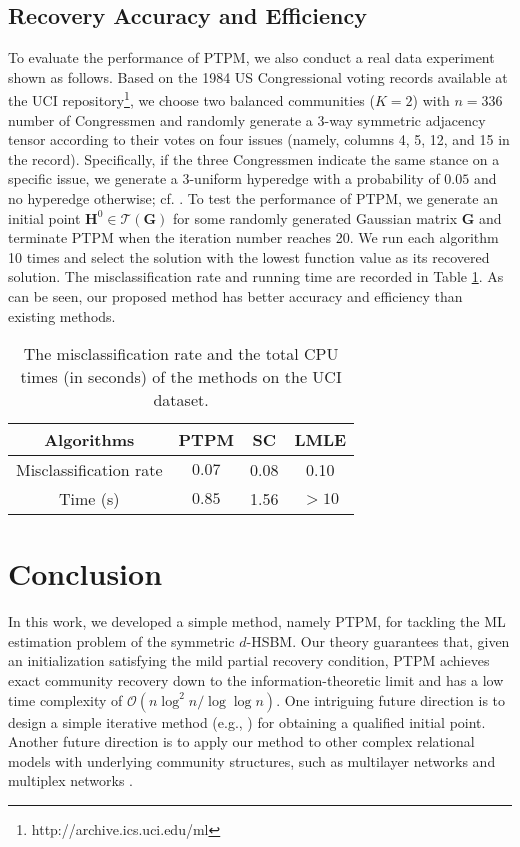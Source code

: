 \documentclass{article}
\theoremstyle{plain}
\theoremstyle{definition}
\theoremstyle{remark}
\newcommand{\OCal}{\mathcal{O}}
\begin{document}
\subsection{Recovery Accuracy and Efficiency}

To evaluate the performance of PTPM, we also conduct a real data experiment shown as follows. Based on the 1984 US Congressional voting records available at the UCI repository\footnote{http://archive.ics.uci.edu/ml}, we choose two balanced communities ($K=2$) with $n=336$ number of Congressmen and randomly generate a 3-way symmetric adjacency tensor according to their votes on four issues (namely, columns 4, 5, 12, and 15 in the record). Specifically, if the three Congressmen indicate the same stance on a specific issue, we generate a 3-uniform hyperedge with a probability of $0.05$ and no hyperedge otherwise; cf. \citet{ghoshdastidar2017consistency,chien2019minimax}. To test the performance of PTPM, we generate an initial point $\bm{H}^0\in\mathcal{T}(\bm{G})$ for some randomly generated Gaussian matrix $\bm{G}$ and terminate PTPM when the iteration number reaches 20. We run each algorithm 10 times and select the solution with the lowest function value as its recovered solution. The misclassification rate and running time are recorded in Table \ref{tab: realdata}. As can be seen, our proposed method has better accuracy and efficiency than existing methods.

\begin{table}[htbp]
	\centering
		\caption{The misclassification rate and the total CPU times (in seconds) of the methods on the UCI dataset.}
  \vskip 0.15in
	\begin{tabular}{cccc}
		\hline Algorithms & PTPM & SC & LMLE \\
		\hline Misclassification rate & $\mathbf{0.07}$ & 0.08 & 0.10 \\
        \hline Time (s) & $\mathbf{0.85}$ & 1.56 & $>10$ \\
		\hline
	\end{tabular}
	\label{tab: realdata}
\end{table}

\section{Conclusion} \label{sec: conclusion}
In this work, we developed a simple method, namely PTPM, for tackling the ML estimation problem of the symmetric $d$-HSBM. Our theory guarantees that, given an initialization satisfying the mild partial recovery condition, PTPM achieves exact community recovery down to the information-theoretic limit and has a low time complexity of $\OCal(n\log^2n/\log\log n)$. One intriguing future direction is to design a simple iterative method (e.g., \citet[Algorithm 1]{wang2021non}) for obtaining a qualified initial point. Another future direction is to apply our method to other complex relational models with underlying community structures, such as multilayer networks \citep{jing2021community,fan2022alma,chen2022global} and multiplex networks \citep{pensky2021clustering,noroozi2022sparse}.
\end{document}
